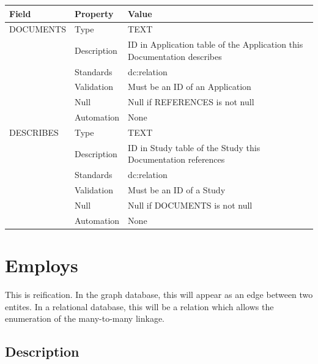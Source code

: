 \begin{longtable}[]{@{}
  >{\raggedright\arraybackslash}p{}
  >{\raggedright\arraybackslash}p{}
  >{\raggedright\arraybackslash}p{}@{}}
\toprule\noalign{}
\begin{minipage}[b]{\linewidth}\raggedright
Field
\end{minipage} & \begin{minipage}[b]{\linewidth}\raggedright
Property
\end{minipage} & \begin{minipage}[b]{\linewidth}\raggedright
Value
\end{minipage} \\
\midrule\noalign{}
\endhead
\bottomrule\noalign{}
\endlastfoot
DOCUMENTS & Type & TEXT \\
& Description & ID in Application table of the Application this
Documentation describes \\
& Standards & dc:relation \\
& Validation & Must be an ID of an Application \\
& Null & Null if REFERENCES is not null \\
& Automation & None \\
DESCRIBES & Type & TEXT \\
& Description & ID in Study table of the Study this Documentation
references \\
& Standards & dc:relation \\
& Validation & Must be an ID of a Study \\
& Null & Null if DOCUMENTS is not null \\
& Automation & None \\
\end{longtable}

\section{Employs}\label{employs}

This is reification. In the graph database, this will appear as an edge
between two entites. In a relational database, this will be a relation
which allows the enumeration of the many-to-many linkage.

\subsection{Description}\label{description-12}

